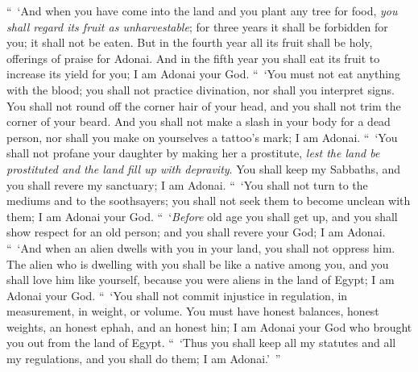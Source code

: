 \begin{biblechapter}
\verse “ ‘And when you have come into the land and you plant any tree for food, \textit{you shall regard its fruit as unharvestable}; for three years it shall be forbidden for you;  it shall not be eaten.
\verse But in the fourth year all its fruit shall be holy, offerings of praise for Adonai.
\verse And in the fifth year you shall eat its fruit to increase its yield for you;  I am Adonai your God.
\verse “ ‘You must not eat anything with the blood; you shall not practice divination, nor shall you interpret signs.
\verse You shall not round off the corner hair of your head, and you shall not trim the corner of your beard.
\verse And you shall not make a slash in your body for a dead person, nor shall you make on yourselves a tattoo’s mark; I am Adonai.
\verse “ ‘You shall not profane your daughter by making her a prostitute, \textit{lest the land be prostituted and the land fill up with depravity}.
\verse You shall keep my Sabbaths, and you shall revere my sanctuary; I am Adonai.
\verse “ ‘You shall not turn to the mediums and to the soothsayers; you shall not seek them to become unclean with them; I am Adonai your God.
\verse “ ‘\textit{Before} old age you shall get up, and you shall show respect for an old person; and you shall revere your God; I am Adonai.
\verse “ ‘And when an alien dwells with you in your land, you shall not oppress him.
\verse The alien who is dwelling with you shall be like a native among you, and you shall love him like yourself,  because you were aliens in the land of Egypt; I am Adonai your God.
\verse “ ‘You shall not commit injustice in regulation, in measurement, in weight, or volume.
\verse You must have honest balances, honest weights, an honest ephah, and an honest hin; I am Adonai your God who brought you out from the land of Egypt.
\verse “ ‘Thus you shall keep all my statutes and all my regulations, and you shall do them; I am Adonai.’ ”
\end{biblechapter}

